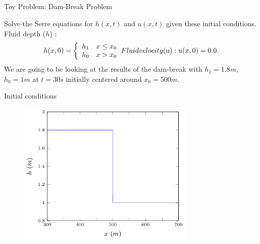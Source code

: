 \documentclass[pdf]{beamer}
\begin{document}
\subsection{}
\begin{frame}{Toy Problem: Dam-Break Problem}
	
	
	Solve the Serre equations for $h(x,t)$ and $u(x,t)$ given these initial conditions.
	Fluid depth ($h$) :
	\begin{subequations}
		\begin{gather*}
		h(x,0) = \left\lbrace \begin{array}{c c}
		h_1  & x \le x_0\\ h_0  & x > x_0 
		\end{array} \right. 
		\end{gather*}
		Fluid velocity  ($u$) :
		\begin{gather*}
		u(x,0) = 0.0 .
		\end{gather*}
	\end{subequations} 	
	We are going to be looking at the results of the dam-break with $h_1 = 1.8m$, $h_0 = 1m$ at $t=30s$ initially centered around $x_0 = 500m$.
	
\end{frame}

\begin{frame}{Initial conditions}
	\begin{figure}
		\includegraphics[width=0.75\textwidth]{../Pics/init/DB/DBinit.pdf}
	\end{figure}
\end{frame}
\end{document}
